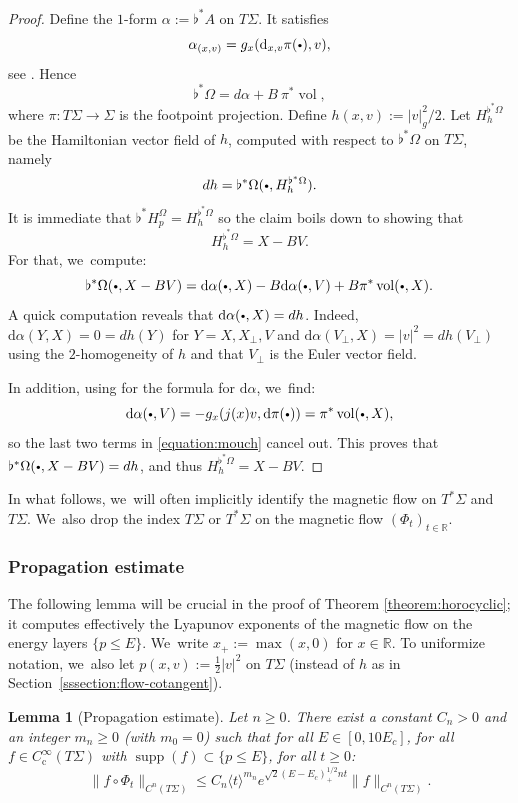\documentclass[JEP,XML,SOM,Unicode,published]{cedram}
\newcommand{\sbullet}{{\scriptscriptstyle\bullet}}
\newcommand{\csbullet}{{\raisebox{1pt}{$\sbullet$}}}
\theoremstyle{plain}
\newtheorem{lemma}[theorem]{Lemma}
\theoremstyle{definition}
\newcommand{\R}{\mathbb{R}}
\newcommand{\dd}{\mathrm{d}}
\DeclareMathOperator{\comp}{c}
\DeclareMathOperator{\supp}{supp}
\DeclareMathOperator{\vol}{vol}
\begin{document}
\begin{proof}
Define the $1$-form $\alpha := \flat^*A$ on $T\Sigma$. It satisfies
\[
\alpha_{(x,v)} = g_x(\dd_{x,v}\pi(\csbullet),v),
\]
see \cite[Lem.\,1.37, item\,1]{Paternain-99}. Hence
\[
\flat^*\Omega = d\alpha + B~ \pi^*\vol,
\]
where $\pi : T\Sigma \to \Sigma$ is the footpoint projection. Define $h(x,v) := |v|^2_g/2$. Let $H_h^{\flat^*\Omega}$ be the Hamiltonian vector field of $h$, computed with respect to $\flat^*\Omega$ on $T\Sigma$, namely
\[
dh = \flat^*\Omega(\csbullet, H_h^{\flat^*\Omega}).
\]
It is immediate that $\flat^* H_p^{\Omega} = H_h^{\flat^*\Omega}$ so the claim boils down to showing that
\[
H_h^{\flat^*\Omega} = X - B V.
\]
For that, we~compute:
\begin{equation}
\label{equation:mouch}
\flat^*\Omega(\csbullet,X-BV) = \dd\alpha(\csbullet, X) - B \dd \alpha(\csbullet, V) + B \pi^*\vol(\csbullet, X).
\end{equation}
A quick computation reveals that $\dd \alpha(\csbullet, X) = dh$. Indeed, $\dd \alpha(Y,X) = 0 = dh(Y)$ for $Y = X,X_\perp,V$ and $\dd \alpha(V_\perp,X) = |v|^2 = dh(V_\perp)$ using the $2$-homogeneity of $h$ and that $V_\perp$ is the Euler vector field.

In addition, using \cite[Prop.\,1.24]{Paternain-99} for the formula for $\dd \alpha$, we~find:
\[
\dd \alpha(\csbullet,V) = - g_x(j(x)v, \dd \pi(\csbullet)) = \pi^*\vol(\csbullet,X),
\]
so the last two terms in \eqref{equation:mouch} cancel out. This proves that $\flat^*\Omega(\csbullet,X-BV) = dh$, and thus $H_h^{\flat^*\Omega} = X - B V$.
\end{proof}

In what follows, we~will often implicitly identify the magnetic flow on $T^*\Sigma$ and $T\Sigma$. We~also drop the index $T\Sigma$ or $T^*\Sigma$ on the magnetic flow $(\Phi_t)_{t \in \R}$.

\subsubsection{Propagation estimate}
The following lemma will be crucial in the proof of Theorem \ref{theorem:horocyclic}; it computes effectively the Lyapunov exponents of the magnetic flow on the energy layers $\{p \leq E\}$. We~write $x_+ := \max(x,0)$ for $x \in \R$. To uniformize notation, we~also let $p(x,v) := \tfrac{1}{2}|v|^2$ on $T\Sigma$ (instead of $h$ as in Section~\ref{sssection:flow-cotangent}).

\begin{lemma}[Propagation estimate]
\label{lemma:wow}
Let $n \geq 0$. There exist a constant $C_n > 0$ and an integer $m_n \geq 0$ (with $m_0 = 0$) such that for all $E \in [0,10E_c]$, for all $f \in C^\infty_{\comp}(T\Sigma)$ with $\supp(f) \subset \{p \leq E\}$, for all $t \geq 0$:
\begin{equation}
\label{equation:key-bound}
\|f \circ \Phi_t\|_{C^n(T\Sigma)} \leq C_n \langle t \rangle^{m_n} e^{\sqrt{2}(E-E_c)_+^{1/2}n t}\|f\|_{C^n(T\Sigma)}.
\end{equation}
\end{lemma}
\end{document}
